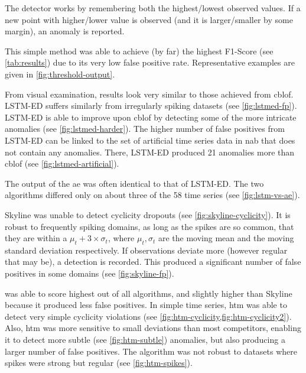 \begin{description}[style=unboxed,leftmargin=0cm]
    The detector works by remembering both the highest/lowest observed values. If a
    new point with higher/lower value is observed (and it is larger/smaller by some
    margin), an anomaly is reported.

    This simple method was able to achieve (by far) the highest F1-Score (see
    \cref{tab:results}) due to its very low false positive rate. Representative
    examples are given in \cref{fig:threshold-output}.
    \item[LSTM-ED] From visual examination, results look very similar to those
    achieved from \gls{cblof}. LSTM-ED suffers similarly from irregularly spiking
    datasets (see \cref{fig:lstmed-fp}). LSTM-ED is able to improve upon \gls{cblof}
    by detecting some of the more intricate anomalies (see \cref{fig:lstmed-harder}).
    The higher number of false positives from LSTM-ED can be linked to the set of
    artificial time series data in \gls{nab} that does not contain any anomalies.
    There, LSTM-ED produced 21 anomalies more than \gls{cblof} (see \cref{fig:lstmed-artificial}).
    \item[Autoencoder] The output of the \gls{ae} was often identical to that of LSTM-ED\@.
    The two algorithms differed only on about three of the 58 time series
    (see \cref{fig:lstm-vs-ae}).
    \item[Skyline] Skyline was unable to detect cyclicity dropouts (see \cref{fig:skyline-cyclicity}).
    It is robust to frequently spiking domains, as long as the spikes are so common,
    that they are within a \(\mu_t + 3 \times \sigma_t\), where \(\mu_t, \sigma_t\)
    are the moving mean and the moving standard deviation respectively.
    If observations deviate more (however regular that may be), a detection is recorded.
    This produced a significant number of false positives in some domains (see \cref{fig:skyline-fp}).
    \item[Numenta HTM] was able to score highest out of all algorithms,
    and slightly higher than Skyline because it produced less false positives. In simple
    time series, \gls{htm} was able to detect very simple cyclicity violations
    (see \cref{fig:htm-cyclicity,fig:htm-cyclicity2}). Also, \gls{htm} was more
    sensitive to small deviations than most competitors, enabling it to detect
    more subtle (see \cref{fig:htm-subtle}) anomalies, but also producing a larger number of false positives.
    The algorithm was not robust to datasets where spikes were strong but regular
    (see \cref{fig:htm-spikes}).
\end{description}
\clearpage{}

